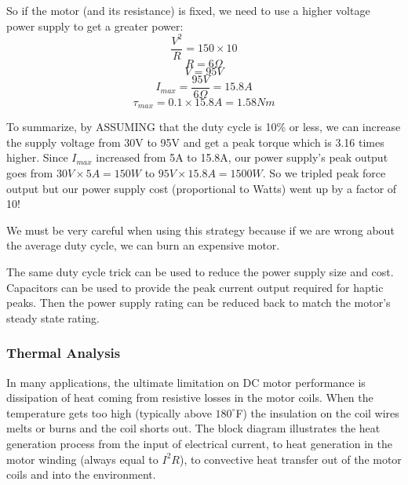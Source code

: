 So if the motor (and its resistance) is fixed, we need to use a
higher voltage power supply to
get a greater power:
\[
\frac{V^2}{R} = 150\times 10
\]
\[
R = 6\Omega
\]
\[
V = 95V
\]
\[
I_{max} = \frac{95V}{6\Omega} =15.8A
\]
\[
\tau_{max} = 0.1\times 15.8A = 1.58Nm
\]

To summarize, by ASSUMING that the duty cycle is 10\% or less, we can increase
the supply voltage from 30V to 95V and get a peak torque which is 3.16 times
higher.  Since $I_{max}$ increased from 5A to 15.8A, our power supply's peak output
goes from $30V\times5A = 150W$ to $95V\times 15.8A = 1500W$.   So we tripled
peak force output but our power supply cost (proportional to Watts) went up by
a factor of 10!

We must be very careful when using this strategy because if we are wrong
about the average duty cycle, we can burn an expensive motor.


The same duty cycle trick can be used to reduce
the power supply size and cost.
Capacitors can be used to provide the peak current output
required for haptic peaks.   Then the power supply rating can be reduced back
to match the motor's steady state rating.

\newpage

\subsubsection{Thermal Analysis}

In many applications, the ultimate limitation on DC motor performance is
dissipation of heat coming from resistive losses in the motor coils.
When the temperature
gets too high (typically above $180^{\circ}$F) the insulation on the coil wires
melts or burns and the coil shorts out.
The block diagram illustrates the heat generation process from the input of electrical
current, to heat generation in the motor winding (always equal to $I^2R$),
to convective heat transfer out of the motor coils and into the environment.

\begin{center}
\end{center}


